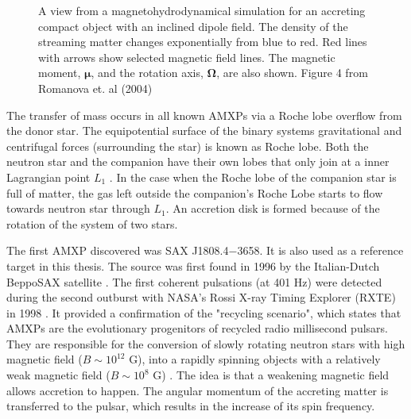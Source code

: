 \documentclass{wihuri}
\def\source{SAX J1808.4$-$3658}
\newcommand{\bmath}[1]{\boldsymbol{#1}}
\begin{document}
\begin{figure}
\centerline{} 
\caption{A view from a magnetohydrodynamical simulation for an accreting compact object with an inclined dipole field. The density of the streaming matter changes exponentially from blue to red. Red lines with arrows show selected magnetic field lines. The magnetic moment, $\bmath{\mu}$, and the rotation axis, $\bmath{\Omega}$, are also shown. Figure 4 from Romanova et. al (2004) \cite{romanova}} 
\label{fig:shcematic}
\end{figure}

The transfer of mass occurs in all known AMXPs via a Roche lobe overflow from the donor star. The equipotential surface of the binary systems gravitational and centrifugal forces (surrounding the star) is known as Roche lobe. Both the neutron star and the companion have their own lobes that  only join at a inner Lagrangian point $L_{1}$ \cite{frank85}. %
In the case when the Roche lobe of the companion star is full of matter, the gas left outside the companion's Roche Lobe starts to flow towards neutron star through $L_{1}$. An accretion disk is formed because of the rotation of the system of two stars.
 

The first AMXP discovered was \source. It is also used as a reference target in this thesis. %
The source was first found in 1996 by the Italian-Dutch BeppoSAX satellite \cite{zandsax1808}. %
The first coherent pulsations (at 401 Hz) were detected during the second outburst with NASA's Rossi X-ray Timing Explorer (RXTE) in 1998 \cite{wijnandssax1808}. %
It provided a confirmation of the "recycling scenario", which states that AMXPs are the evolutionary progenitors of recycled radio millisecond pulsars. They are responsible for the conversion of slowly rotating neutron stars with high magnetic field ($B \sim 10^{12}$ G), into a rapidly spinning objects with a relatively weak magnetic field ($B \sim 10^{8}$ G) \cite{patruno}. The idea is that a weakening magnetic field allows accretion to happen. The angular momentum of the accreting matter is transferred to the pulsar, which results in the increase of its spin frequency.%
\end{document}
